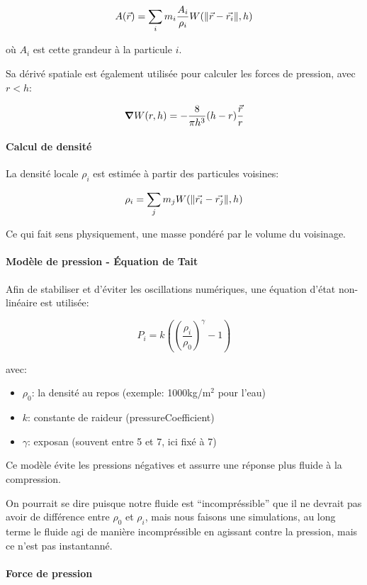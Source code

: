 \documentclass{article}
\begin{document}
\[
    A(\vec{r}) = \sum_{i} m_i \frac{A_i}{\rho_i} W(\norm{\vec{r} - \vec{r_i}}, h)
\]

où \(A_i\) est cette grandeur à la particule \(i\).

Sa dérivé spatiale est également utilisée pour calculer les forces de pression, avec \(r < h\):

\[
    \grad W(r, h) = -\frac{8}{\pi h^3}(h - r)\frac{\vec{r}}{r}
\]

\paragraph{Calcul de densité}

La densité locale \(\rho_i\) est estimée à partir des particules voisines:

\[
    \rho_i = \sum_j m_j W(\norm{\vec{r_i} - \vec{r_j}}, h)
\]

Ce qui fait sens physiquement, une masse pondéré par le volume du voisinage.

\paragraph{Modèle de pression - Équation de Tait}

Afin de stabiliser et d'éviter les oscillations numériques, une équation d'état non-linéaire est utilisée:

\[
    P_i =  k \left (\left ( \frac{\rho_i}{\rho_0}\right )^\gamma - 1 \right )
\]

avec:

\begin{itemize}
    \item \(\rho_0\): la densité au repos (exemple: 1000kg/m\(^2\) pour l'eau)
    \item \(k\): constante de raideur (pressureCoefficient)
    \item \(\gamma\): exposan (souvent entre 5 et 7, ici fixé à 7)
\end{itemize}

Ce modèle évite les pressions négatives et assurre une réponse plus fluide à la compression.

On pourrait se dire puisque notre fluide est ``incompréssible'' que il ne devrait pas avoir de différence entre \(\rho_0\) et \(\rho_i\), mais nous faisons une simulations, au long terme le fluide agi de manière incompréssible en agissant contre la pression, mais ce n'est pas instantanné.

\paragraph{Force de pression}
\end{document}
